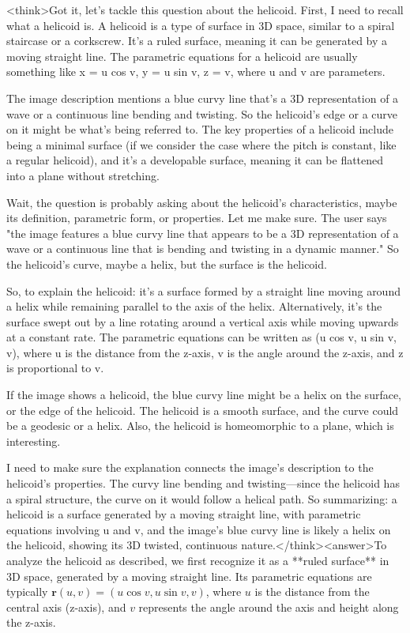 <think>Got it, let's tackle this question about the helicoid. First, I need to recall what a helicoid is. A helicoid is a type of surface in 3D space, similar to a spiral staircase or a corkscrew. It's a ruled surface, meaning it can be generated by a moving straight line. The parametric equations for a helicoid are usually something like x = u cos v, y = u sin v, z = v, where u and v are parameters. 

The image description mentions a blue curvy line that's a 3D representation of a wave or a continuous line bending and twisting. So the helicoid's edge or a curve on it might be what's being referred to. The key properties of a helicoid include being a minimal surface (if we consider the case where the pitch is constant, like a regular helicoid), and it's a developable surface, meaning it can be flattened into a plane without stretching. 

Wait, the question is probably asking about the helicoid's characteristics, maybe its definition, parametric form, or properties. Let me make sure. The user says "the image features a blue curvy line that appears to be a 3D representation of a wave or a continuous line that is bending and twisting in a dynamic manner." So the helicoid's curve, maybe a helix, but the surface is the helicoid. 

So, to explain the helicoid: it's a surface formed by a straight line moving around a helix while remaining parallel to the axis of the helix. Alternatively, it's the surface swept out by a line rotating around a vertical axis while moving upwards at a constant rate. The parametric equations can be written as (u cos v, u sin v, v), where u is the distance from the z-axis, v is the angle around the z-axis, and z is proportional to v. 

If the image shows a helicoid, the blue curvy line might be a helix on the surface, or the edge of the helicoid. The helicoid is a smooth surface, and the curve could be a geodesic or a helix. Also, the helicoid is homeomorphic to a plane, which is interesting. 

I need to make sure the explanation connects the image's description to the helicoid's properties. The curvy line bending and twisting—since the helicoid has a spiral structure, the curve on it would follow a helical path. So summarizing: a helicoid is a surface generated by a moving straight line, with parametric equations involving u and v, and the image's blue curvy line is likely a helix on the helicoid, showing its 3D twisted, continuous nature.</think><answer>To analyze the helicoid as described, we first recognize it as a **ruled surface** in 3D space, generated by a moving straight line. Its parametric equations are typically \( \mathbf{r}(u, v) = (u \cos v, u \sin v, v) \), where \( u \) is the distance from the central axis (z-axis), and \( v \) represents the angle around the axis and height along the z-axis.  

